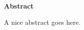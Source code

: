 %
%

\begin{center}

\bigskip

\begin{Large}
\textbf{\theTitle}
\end{Large}

\bigskip

\begin{large}
\theAuthor
\end{large}

\bigskip
\bigskip

\textbf{Abstract}

\end{center}

\noindent
A nice abstract goes here.

